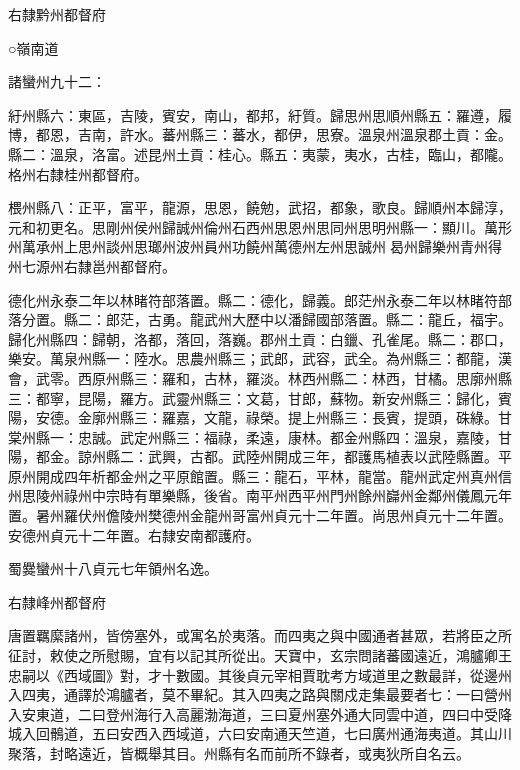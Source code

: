 \begin{pinyinscope}
 右隸黔州都督府



 ○嶺南道



 諸蠻州九十二：



 紆州縣六：東區，吉陵，賓安，南山，都邦，紆質。歸思州思順州縣五：羅遵，履博，都恩，吉南，許水。蕃州縣三：蕃水，都伊，思寮。溫泉州溫泉郡土貢：金。縣二：溫泉，洛富。述昆州土貢：桂心。縣五：夷蒙，夷水，古桂，臨山，都隴。格州右隸桂州都督府。



 椳州縣八：正平，富平，龍源，思恩，饒勉，武招，都象，歌良。歸順州本歸淳，元和初更名。思剛州侯州歸誠州倫州石西州思恩州思同州思明州縣一：顯川。萬形州萬承州上思州談州思瑯州波州員州功饒州萬德州左州思誠州曷州歸樂州青州得州七源州右隸邕州都督府。



 德化州永泰二年以林睹符部落置。縣二：德化，歸義。郎茫州永泰二年以林睹符部落分置。縣二：郎茫，古勇。龍武州大歷中以潘歸國部落置。縣二：龍丘，福宇。歸化州縣四：歸朝，洛都，落回，落巍。郡州土貢：白鑞、孔雀尾。縣二：郡口，樂安。萬泉州縣一：陸水。思農州縣三；武郎，武容，武全。為州縣三：都龍，漢會，武零。西原州縣三：羅和，古林，羅淡。林西州縣二：林西，甘橘。思廓州縣三：都寧，昆陽，羅方。武靈州縣三：文葛，甘郎，蘇物。新安州縣三：歸化，賓陽，安德。金廓州縣三：羅嘉，文龍，祿榮。提上州縣三：長賓，提頭，硃綠。甘棠州縣一：忠誠。武定州縣三：福祿，柔遠，康林。都金州縣四：溫泉，嘉陵，甘陽，都金。諒州縣二：武興，古都。武陸州開成三年，都護馬植表以武陸縣置。平原州開成四年析都金州之平原館置。縣三：龍石，平林，龍當。龍州武定州真州信州思陵州祿州中宗時有單樂縣，後省。南平州西平州門州餘州巋州金鄰州儀鳳元年置。暑州羅伏州儋陵州樊德州金龍州哥富州貞元十二年置。尚思州貞元十二年置。安德州貞元十二年置。右隸安南都護府。



 蜀爨蠻州十八貞元七年領州名逸。



 右隸峰州都督府



 唐置羈縻諸州，皆傍塞外，或寓名於夷落。而四夷之與中國通者甚眾，若將臣之所征討，敕使之所慰賜，宜有以記其所從出。天寶中，玄宗問諸蕃國遠近，鴻臚卿王忠嗣以《西域圖》對，才十數國。其後貞元宰相賈耽考方域道里之數最詳，從邊州入四夷，通譯於鴻臚者，莫不畢紀。其入四夷之路與關戍走集最要者七：一曰營州入安東道，二曰登州海行入高麗渤海道，三曰夏州塞外通大同雲中道，四曰中受降城入回鶻道，五曰安西入西域道，六曰安南通天竺道，七曰廣州通海夷道。其山川聚落，封略遠近，皆概舉其目。州縣有名而前所不錄者，或夷狄所自名云。




\end{pinyinscope}
